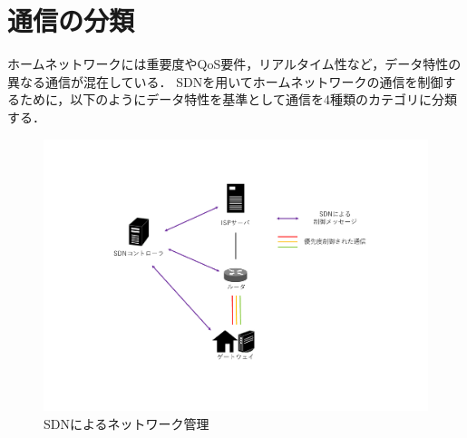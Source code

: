 \documentclass[a4paper,11pt,uplatex]{ujreport}
\begin{document}

\section{通信の分類}
\label{sec:通信の分類}

  ホームネットワークには重要度やQoS要件，リアルタイム性など，データ特性の異なる通信が混在している．
  SDNを用いてホームネットワークの通信を制御するために，以下のようにデータ特性を基準として通信を4種類のカテゴリに分類する．

  \clearpage

  \begin{figure}[!tb]
    \centering
    \includegraphics[width=\linewidth]{img/proposal.pdf}
    \caption{SDNによるネットワーク管理}
    \label{fig:proposal}
  \end{figure}
\end{document}
